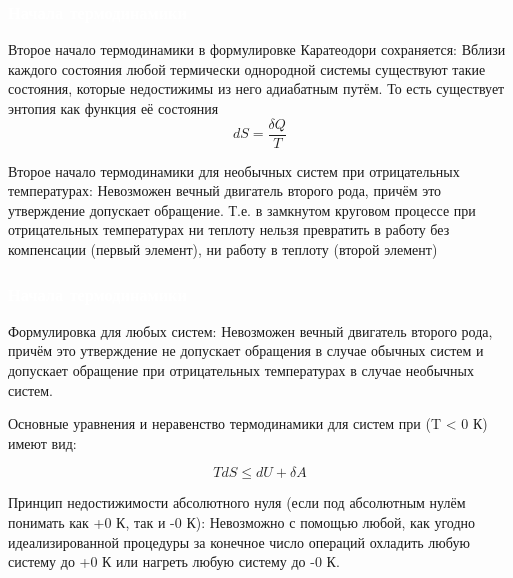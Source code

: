 \documentclass[aspectratio=169]{beamer}
\begin{document}
\begin{frame}
\frametitle{\textcolor{white}{Начала термодинамики}} 

Второе начало термодинамики в формулировке Каратеодори сохраняется:
Вблизи каждого состояния любой термически однородной системы существуют такие состояния, которые недостижимы из него адиабатным путём. 
То есть существует энтопия как функция её состояния 
\begin{equation}
dS = \frac{\delta Q}{T}
\end{equation}


\vspace{0.16cm}
Второе начало термодинамики для необычных систем при отрицательных температурах:
Невозможен вечный двигатель второго рода, причём это утверждение допускает обращение.
Т.е. в замкнутом круговом процессе при отрицательных температурах ни теплоту нельзя превратить в работу без компенсации (первый элемент), ни работу в теплоту (второй элемент)


\end{frame}

\begin{frame}
\frametitle{\textcolor{white}{Начала термодинамики}} 

Формулировка для любых систем:
Невозможен вечный двигатель второго рода, причём это утверждение не допускает обращения в случае обычных систем и допускает обращение при отрицательных температурах в случае необычных систем.

Основные уравнения и неравенство термодинамики для систем при (T < 0 К) имеют вид:

\begin{equation}
TdS \leqslant dU + \delta A
\end{equation}

\vspace{0.2cm}

Принцип недостижимости абсолютного нуля (если под абсолютным нулём понимать как +0 К, так и -0 К): 
Невозможно с помощью любой, как угодно идеализированной процедуры за конечное число операций охладить любую систему до +0 К или нагреть любую систему до -0 К.
\end{frame}
\end{document}
